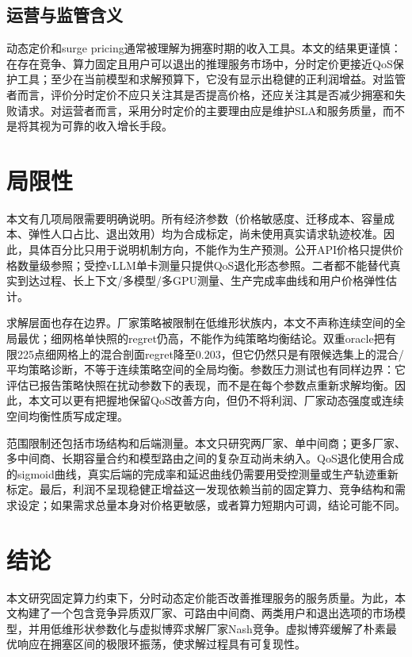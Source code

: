 \documentclass[UTF8,11pt]{ctexart}
\begin{document}
\subsection{运营与监管含义}

动态定价和surge pricing通常被理解为拥塞时期的收入工具。本文的结果更谨慎：在存在竞争、算力固定且用户可以退出的推理服务市场中，分时定价更接近QoS保护工具；至少在当前模型和求解预算下，它没有显示出稳健的正利润增益。对监管者而言，评价分时定价不应只关注其是否提高价格，还应关注其是否减少拥塞和失败请求。对运营者而言，采用分时定价的主要理由应是维护SLA和服务质量，而不是将其视为可靠的收入增长手段。

\section{局限性}
\label{sec:limitations}

本文有几项局限需要明确说明。所有经济参数（价格敏感度、迁移成本、容量成本、弹性人口占比、退出效用）均为合成标定，尚未使用真实请求轨迹校准。因此，具体百分比只用于说明机制方向，不能作为生产预测。公开API价格只提供价格数量级参照；受控vLLM单卡测量只提供QoS退化形态参照。二者都不能替代真实到达过程、长上下文/多模型/多GPU测量、生产完成率曲线和用户价格弹性估计。

求解层面也存在边界。厂家策略被限制在低维形状族内，本文不声称连续空间的全局最优；细网格单快照的regret仍高，不能作为纯策略均衡结论。双重oracle把有限225点细网格上的混合剖面regret降至$0.203$，但它仍然只是有限候选集上的混合/平均策略诊断，不等于连续策略空间的全局均衡。参数压力测试也有同样边界：它评估已报告策略快照在扰动参数下的表现，而不是在每个参数点重新求解均衡。因此，本文可以更有把握地保留QoS改善方向，但仍不将利润、厂家动态强度或连续空间均衡性质写成定理。

范围限制还包括市场结构和后端测量。本文只研究两厂家、单中间商；更多厂家、多中间商、长期容量合约和模型路由之间的复杂互动尚未纳入。QoS退化使用合成的sigmoid曲线，真实后端的完成率和延迟曲线仍需要用受控测量或生产轨迹重新标定。最后，利润不呈现稳健正增益这一发现依赖当前的固定算力、竞争结构和需求设定；如果需求总量本身对价格更敏感，或者算力短期内可调，结论可能不同。

\section{结论}
\label{sec:conclusion}

本文研究固定算力约束下，分时动态定价能否改善推理服务的服务质量。为此，本文构建了一个包含竞争异质双厂家、可路由中间商、两类用户和退出选项的市场模型，并用低维形状参数化与虚拟博弈求解厂家Nash竞争。虚拟博弈缓解了朴素最优响应在拥塞区间的极限环振荡，使求解过程具有可复现性。
\end{document}
